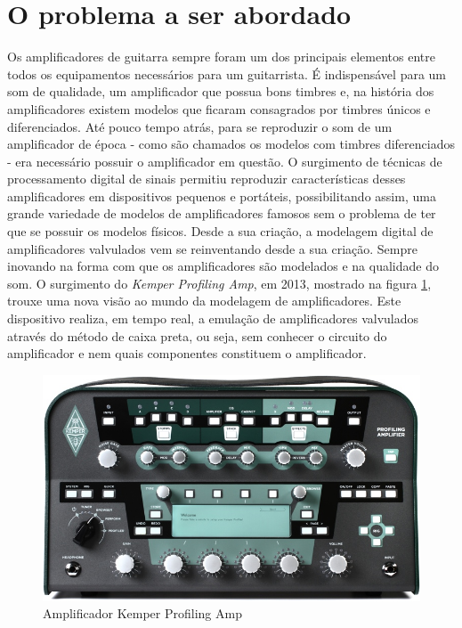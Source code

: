 \section*{O problema a ser abordado}
Os amplificadores de guitarra sempre foram um dos principais elementos entre todos os equipamentos necessários para um guitarrista. É indispensável para um som de qualidade, um amplificador que possua bons timbres e, na história dos amplificadores existem modelos que ficaram consagrados por timbres únicos e diferenciados. Até pouco tempo atrás, para se reproduzir o som de um amplificador de época - como são chamados os modelos com timbres diferenciados - era necessário possuir o amplificador em questão. O surgimento de técnicas de processamento digital de sinais permitiu reproduzir características desses amplificadores em dispositivos pequenos e portáteis, possibilitando assim, uma grande variedade de modelos de amplificadores famosos sem o problema de ter que se possuir os modelos físicos. Desde a sua criação, a modelagem digital de amplificadores valvulados vem se reinventando desde a sua criação. Sempre inovando na forma com que os amplificadores são modelados e na qualidade do som. O surgimento do \textit{Kemper Profiling Amp}, em 2013, mostrado na figura \ref{fig:profilingampbk-large}, trouxe uma nova visão ao mundo da modelagem de amplificadores. Este dispositivo realiza, em tempo real, a emulação de amplificadores valvulados através do método de caixa preta, ou seja, sem conhecer o circuito do amplificador e nem quais componentes constituem o amplificador.

\begin{figure}[!htb]
	\centering
	\includegraphics[width=0.7\linewidth]{figuras/ProfilingAmpBK-large}
	\caption{Amplificador Kemper Profiling Amp}
	\label{fig:profilingampbk-large}
\end{figure}





